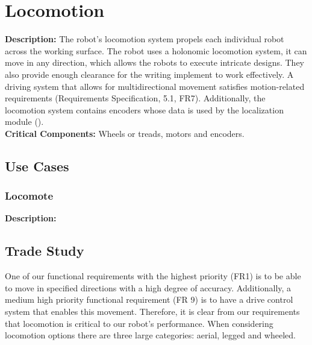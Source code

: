 
\section{Locomotion}
\label{sec:locomotion}
\textbf{Description:} The robot's locomotion system propels each individual robot across the working surface. The robot uses a holonomic locomotion system, it can move in any direction, which allows the robots to execute intricate designs.  They also provide enough clearance for the writing implement to work effectively. A driving system that allows for multidirectional movement satisfies motion-related requirements (Requirements Specification, 5.1, FR7). Additionally, the locomotion system contains encoders whose data is used by the localization module (). \\

\noindent
\textbf{Critical Components:} Wheels or treads, motors and encoders.


\subsection{Use Cases}
\subsubsection{Locomote}
\textbf{Description:} 

\subsection{Trade Study}
\label{sec:trade_locomotion}
One of our functional requirements with the highest priority (FR1) is to be able to move in specified directions with a high degree of accuracy. Additionally, a medium high priority functional requirement (FR 9) is to have a drive control system that enables this movement. Therefore, it is clear from our requirements that locomotion is critical to our robot's performance. When considering locomotion options there are three large categories: aerial, legged and wheeled.

